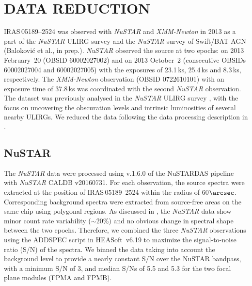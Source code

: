 \documentclass[]{emulateapj}
\def \nustar {{\em NuSTAR }}
\def \xmm {{\em XMM-Newton }}
\def \iras {{IRAS\,05189--2524 }}
\begin{document}
\section{DATA REDUCTION}
\label{sec:data}
\iras was observed with \nustar \citep{har13} and \xmm \citep{jan01} in 2013 as a part of the \nustar ULIRG survey \citep{ten15} and the \nustar survey of Swift/BAT AGN (Balokovi\'{c} et al., in prep.). \nustar observed the source at two epochs: on 2013 February~20 (OBSID 60002027002) and on 2013 October~2 (consecutive OBSIDs 60002027004 and 60002027005) with the exposures of 23.1\,ks, 25.4\,ks and 8.3\,ks, respectively. The \xmm observation (OBSID 0722610101) with an exposure time of 37.8\,ks was coordinated with the second \nustar observation. The dataset was previously analysed in the \nustar ULIRG survey \citep{ten15}, with the focus on uncovering the obscuration levels and intrinsic luminosities of several nearby ULIRGs. We reduced the data following the data processing description in \cite{ten15}. 

\subsection{NuSTAR} 
The \nustar data were processed using v.1.6.0 of the NuSTARDAS pipeline with \nustar CALDB v20160731. For each observation, the source spectra were extracted at the position of \iras within the radius of 60$\arcsec$. Corresponding background spectra were extracted from source-free areas on the same chip using polygonal regions. As discussed in \cite{ten15}, the \nustar data show minor count rate variability ($\sim$20\%) and no obvious change in spectral shape between the two epochs. Therefore, we combined the three \nustar observations using the {\small ADDSPEC} script in HEASoft~v6.19 to maximize the signal-to-noise ratio (S/N) of the spectra. We binned the data taking into account the background level to provide a nearly constant S/N over the NuSTAR bandpass, with a minimum S/N of 3, and median S/Ns of 5.5 and 5.3 for the two focal plane modules (FPMA and FPMB).
\end{document}
